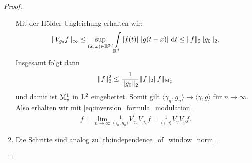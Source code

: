\begin{proof}
\begin{enumerate}[label =\textbf{(\roman*)}]
		Mit der Hölder-Ungleichung erhalten wir:
		\begin{align*}
		\| V_{g_0}  f\|_\infty
		\leq
		\sup \limits_{(x,\omega) \in \mathbb{R}^{2d}}
		\int \limits_{\mathbb{R}^d}
		| f(t) | \ | g(t - x )| \text{ d} t
		\leq
		\|f \|_2 \|g_0 \|_2.
		\end{align*}
		Insgesamt folgt dann
		\begin{align*}
		\|f \|^2_2 
		\leq \frac{1}{\| g_0 \|_2} \| f \|_2 \| f \|_{\mathrm{M}_v^1}
		\end{align*}
		und damit ist $ \mathrm{M}_v^1  $ in $ \mathrm{L}^2 $ eingebettet. Somit gilt
		$ \langle \gamma_n,g_n \rangle \to \langle \gamma , g \rangle  $ für $ n \to \infty $.
		Also erhalten wir mit \eqref{eq:inversion_formula_modulation}
		\begin{align*}
		f=
		\lim \limits_{n \to \infty}
		\frac{1}{\langle \gamma_n,g_n \rangle} V_{\gamma_n}^\prime V_{g_n} f = 
		\frac{1}{\langle \gamma , g \rangle} V_\gamma^\prime V_g f.
		\end{align*}
		\item 
		Die Schritte sind analog zu \ref{th:independence_of_window_norm}.
		
	\end{enumerate}
\end{proof}